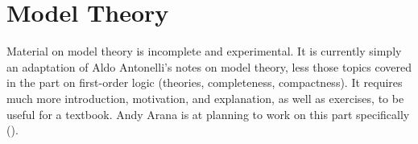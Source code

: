 \documentclass[../../include/open-logic-part]{subfiles}
\begin{document}
\part{Model Theory}

\begin{editorial}
  Material on model theory is incomplete and experimental.  It is
  currently simply an adaptation of Aldo Antonelli's notes on model
  theory, less those topics covered in the part on first-order logic
  (theories, completeness, compactness).  It requires much more
  introduction, motivation, and explanation, as well as exercises, to
  be useful for a textbook.  Andy Arana is at planning to work on this
  part specifically ().
\end{editorial}





\OLEndPartHook
\end{document}

